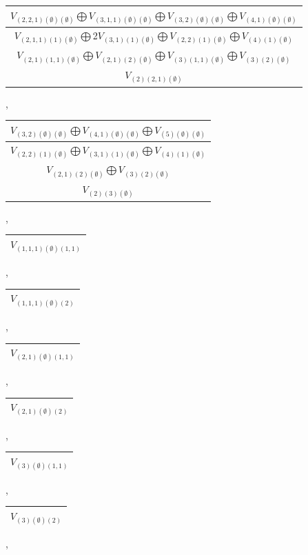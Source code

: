 \documentclass[letterpaper,11pt]{article}
\begin{document}
	\begin{tabular}{| c |}
		\hline
		$V_{(2,2,1)(\emptyset)(\emptyset)}$$\bigoplus$$V_{(3,1,1)(\emptyset)(\emptyset)}$$\bigoplus$$V_{(3,2)(\emptyset)(\emptyset)}$$\bigoplus$$V_{(4,1)(\emptyset)(\emptyset)}$\\
		\hline
		$V_{(2,1,1)(1)(\emptyset)}$$\bigoplus$2$V_{(3,1)(1)(\emptyset)}$$\bigoplus$$V_{(2,2)(1)(\emptyset)}$$\bigoplus$$V_{(4)(1)(\emptyset)}$\\
		\hline
		$V_{(2,1)(1,1)(\emptyset)}$$\bigoplus$$V_{(2,1)(2)(\emptyset)}$$\bigoplus$$V_{(3)(1,1)(\emptyset)}$$\bigoplus$$V_{(3)(2)(\emptyset)}$\\
		\hline
		$V_{(2)(2,1)(\emptyset)}$\\
		\hline
	\end{tabular}, 
	\newline 
	\begin{tabular}{| c |}
		\hline
		$V_{(3,2)(\emptyset)(\emptyset)}$$\bigoplus$$V_{(4,1)(\emptyset)(\emptyset)}$$\bigoplus$$V_{(5)(\emptyset)(\emptyset)}$\\
		\hline
		$V_{(2,2)(1)(\emptyset)}$$\bigoplus$$V_{(3,1)(1)(\emptyset)}$$\bigoplus$$V_{(4)(1)(\emptyset)}$\\
		\hline
		$V_{(2,1)(2)(\emptyset)}$$\bigoplus$$V_{(3)(2)(\emptyset)}$\\
		\hline
		$V_{(2)(3)(\emptyset)}$\\
		\hline
	\end{tabular}, 
	\begin{tabular}{| c |}
		\hline
		$V_{(1,1,1)(\emptyset)(1,1)}$\\
		\hline
	\end{tabular}, 
	\begin{tabular}{| c |}
		\hline
		$V_{(1,1,1)(\emptyset)(2)}$\\
		\hline
	\end{tabular}, 
	\begin{tabular}{| c |}
		\hline
		$V_{(2,1)(\emptyset)(1,1)}$\\
		\hline
	\end{tabular}, 
	\begin{tabular}{| c |}
		\hline
		$V_{(2,1)(\emptyset)(2)}$\\
		\hline
	\end{tabular}, 
	\begin{tabular}{| c |}
		\hline
		$V_{(3)(\emptyset)(1,1)}$\\
		\hline
	\end{tabular}, 
	\begin{tabular}{| c |}
		\hline
		$V_{(3)(\emptyset)(2)}$\\
		\hline
	\end{tabular}, 
\end{document}
